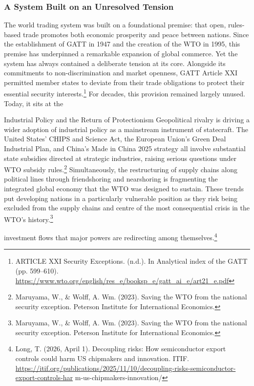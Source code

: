 \subsubsection{A System Built on an Unresolved Tension}

The world trading system was built on a foundational premise: that open, rules-based trade promotes both economic prosperity and peace between nations. Since the establishment of GATT in 1947 and the creation of the WTO in 1995, this premise has underpinned a remarkable expansion of global commerce. Yet the system has always contained a deliberate tension at its core. Alongside its commitments to non-discrimination and market openness, GATT Article XXI permitted member states to deviate from their trade obligations to protect their essential security interests.\footnote{ARTICLE XXI Security Exceptions. (n.d.). In Analytical index of the GATT (pp. 599–610). \url{https://www.wto.org/english/res_e/booksp_e/gatt_ai_e/art21_e.pdf}} For decades, this provision remained largely unused. Today, it sits at the

Industrial Policy and the Return of Protectionism Geopolitical rivalry is driving a wider adoption of industrial policy as a mainstream instrument of statecraft. The United States' CHIPS and Science Act, the European Union's Green Deal Industrial Plan, and China's Made in China 2025 strategy all involve substantial state subsidies directed at strategic industries, raising serious questions under WTO subsidy rules.\footnote{Maruyama, W., \& Wolff, A. Wm. (2023). Saving the WTO from the national security exception. Peterson Institute for International Economics.} Simultaneously, the restructuring of supply chains along political lines through friendshoring and nearshoring is fragmenting the integrated global economy that the WTO was designed to sustain. These trends put developing nations in a particularly vulnerable position as they risk being excluded from the supply chains and centre of the most consequential crisis in the WTO's history.\footnote{Maruyama, W., \& Wolff, A. Wm. (2023). Saving the WTO from the national security exception. Peterson Institute for International Economics.}

investment flows that major powers are redirecting among themselves.\footnote{Long, T. (2026, April 1). Decoupling risks: How semiconductor export controls could harm US chipmakers and innovation. ITIF. \url{https://itif.org/publications/2025/11/10/decoupling-risks-semiconductor-export-controls-har} m-us-chipmakers-innovation/}

